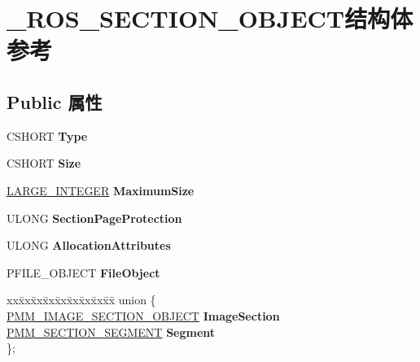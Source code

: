 \hypertarget{struct___r_o_s___s_e_c_t_i_o_n___o_b_j_e_c_t}{}\section{\+\_\+\+R\+O\+S\+\_\+\+S\+E\+C\+T\+I\+O\+N\+\_\+\+O\+B\+J\+E\+C\+T结构体 参考}
\label{struct___r_o_s___s_e_c_t_i_o_n___o_b_j_e_c_t}
\subsection*{Public 属性}
\begin{DoxyCompactItemize}
\item 
\mbox{\label{struct___r_o_s___s_e_c_t_i_o_n___o_b_j_e_c_t_a5939bc6692b8c73556622b3157cc12aa}} 
C\+S\+H\+O\+RT {\bfseries Type}
\item 
\mbox{\label{struct___r_o_s___s_e_c_t_i_o_n___o_b_j_e_c_t_a0c26d14a8ca155a9e497f606d8c30654}} 
C\+S\+H\+O\+RT {\bfseries Size}
\item 
\mbox{\label{struct___r_o_s___s_e_c_t_i_o_n___o_b_j_e_c_t_a33c299100f26bce291683d943a8d75ce}} 
\hyperlink{union___l_a_r_g_e___i_n_t_e_g_e_r}{L\+A\+R\+G\+E\+\_\+\+I\+N\+T\+E\+G\+ER} {\bfseries Maximum\+Size}
\item 
\mbox{\label{struct___r_o_s___s_e_c_t_i_o_n___o_b_j_e_c_t_a46a68d6804ad343c9a66b386ff63d913}} 
U\+L\+O\+NG {\bfseries Section\+Page\+Protection}
\item 
\mbox{\label{struct___r_o_s___s_e_c_t_i_o_n___o_b_j_e_c_t_a41f4714a8a7235a1612c0fb7e3427d1d}} 
U\+L\+O\+NG {\bfseries Allocation\+Attributes}
\item 
\mbox{\label{struct___r_o_s___s_e_c_t_i_o_n___o_b_j_e_c_t_a35ebfadde99c473652b716994fa5b5fd}} 
P\+F\+I\+L\+E\+\_\+\+O\+B\+J\+E\+CT {\bfseries File\+Object}
\item 
\mbox{\label{struct___r_o_s___s_e_c_t_i_o_n___o_b_j_e_c_t_ae19cf94d7992df5b87a1fdf196e12091}} 
\begin{tabbing}
xx\=xx\=xx\=xx\=xx\=xx\=xx\=xx\=xx\=\kill
union \{\\
\>\hyperlink{struct___m_m___i_m_a_g_e___s_e_c_t_i_o_n___o_b_j_e_c_t}{PMM\_IMAGE\_SECTION\_OBJECT} {\bfseries ImageSection}\\
\>\hyperlink{struct___m_m___s_e_c_t_i_o_n___s_e_g_m_e_n_t}{PMM\_SECTION\_SEGMENT} {\bfseries Segment}\\
\}; \\


\end{tabbing}
\end{DoxyCompactItemize}

